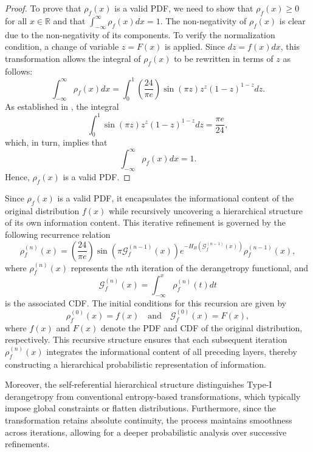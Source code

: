 \documentclass[sn-mathphys-num]{sn-jnl}%
\theoremstyle{thmstyleone}%
\theoremstyle{thmstyletwo}%
\theoremstyle{thmstylethree}%
\begin{document}
\begin{proof}
	To prove that $\rho_f(x)$ is a valid PDF, we need to show that $\rho_f(x) \geq 0$ for all $x \in \mathbb{R}$ and that $\int_{-\infty}^{\infty} \rho_f(x) d x=1$. The non-negativity of $\rho_f(x)$ is clear due to the non-negativity of its components. To verify the normalization condition, a change of variable $z=F(x)$ is applied. Since $d z=f(x) d x$, this transformation allows the integral of $\rho_f(x)$ to be rewritten in terms of $z$ as follows:
	\begin{equation}
		\int_{-\infty}^{\infty} \rho_f(x) d x=\int_0^1\left(\frac{24}{\pi e}\right) \sin (\pi z) z^z(1-z)^{1-z} d z.
	\end{equation}
	As established in \cite{ataei2024derangetropy}, the integral
	\begin{equation}
		\int_0^1 \sin (\pi z) z^z(1-z)^{1-z} d z=\frac{\pi e}{24},
	\end{equation}	
	which, in turn, implies that	
	\begin{equation}
		\int_{-\infty}^{\infty} \rho_f(x) d x=1.
	\end{equation}	
	Hence, $\rho_f(x)$ is a valid PDF.
\end{proof}

Since $\rho_f(x)$ is a valid PDF, it encapsulates the informational content of the original distribution $f(x)$ while recursively uncovering a hierarchical structure of its own information content. This iterative refinement is governed by the following recurrence relation
\begin{equation}
	\rho_f^{(n)}(x) = \left(\frac{24}{\pi e}\right) \sin\left(\pi \mathcal{G}_f^{(n-1)}(x)\right) e^{-H_B(\mathcal{G}_f^{(n-1)}(x))} \rho_f^{(n-1)}(x),
\end{equation}
where $\rho_f^{(n)}(x)$ represents the $n$th iteration of the derangetropy functional, and
$$
\mathcal{G}_f^{(n)}(x)=\int_{-\infty}^x \rho_f^{(n)}(t) d t
$$
is the associated CDF. The initial conditions for this recursion are given by
$$
\rho_f^{(0)}(x)=f(x) \quad \text{and} \quad \mathcal{G}_f^{(0)}(x)=F(x),
$$
where $f(x)$ and $F(x)$ denote the PDF and CDF of the original distribution, respectively. This recursive structure ensures that each subsequent iteration $\rho_f^{(n)}(x)$ integrates the informational content of all preceding layers, thereby constructing a hierarchical probabilistic representation of information.

Moreover, the self-referential hierarchical structure distinguishes Type-I derangetropy from conventional entropy-based transformations, which typically impose global constraints or flatten distributions. Furthermore, since the transformation retains absolute continuity, the process maintains smoothness across iterations, allowing for a deeper probabilistic analysis over successive refinements.
\end{document}
